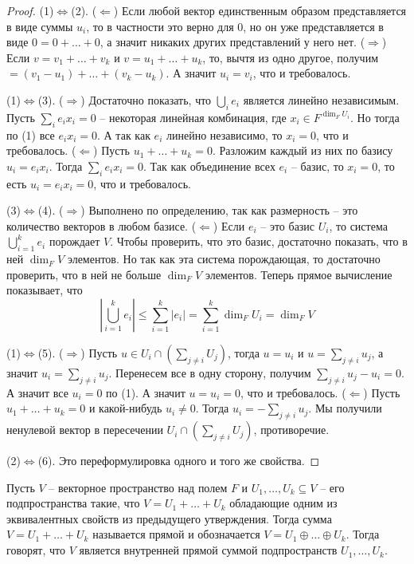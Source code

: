 \begin{proof}
(1)$\Leftrightarrow$(2).
($\Leftarrow$) Если любой вектор единственным образом представляется в виде суммы $u_i$, то в частности это верно для $0$, но он уже представляется в виде $0 = 0 + \ldots + 0$, а значит никаких других представлений у него нет.
($\Rightarrow$) Если $v = v_1 + \ldots + v_k$ и $v = u_1 + \ldots + u_k$, то, вычтя из одно другое, получим $ = (v_1 - u_1) + \ldots + (v_k - u_k)$.
А значит $u_i = v_i$, что и требовалось.

(1)$\Leftrightarrow$(3).
($\Rightarrow$) Достаточно показать, что $\bigcup_i e_i$ является линейно независимым.
Пусть $\sum_i e_i x_i = 0$ -- некоторая линейная комбинация, где $x_i\in F^{\dim_F U_i}$.
Но тогда по (1) все $e_i x_i = 0$.
А так как $e_i$ линейно независимо, то $x_i = 0$, что и требовалось.
($\Leftarrow$) Пусть $u_1 + \ldots + u_k = 0$.
Разложим каждый из них по базису $u_i = e_i x_i$.
Тогда $\sum_i e_i x_i = 0$.
Так как объединение всех $e_i$ -- базис, то $x_i = 0$, то есть $u_i = e_i x_i = 0$, что и требовалось.

(3)$\Leftrightarrow$(4).
($\Rightarrow$) Выполнено по определению, так как размерность -- это количество векторов в любом базисе.
($\Leftarrow$) Если $e_i$ -- это базис $U_i$, то система $\bigcup_{i=1}^k e_i$ порождает $V$.
Чтобы проверить, что это базис, достаточно показать, что в ней $\dim_F V$ элементов.
Но так как эта система порождающая, то достаточно проверить, что в ней не больше $\dim_F V$ элементов.
Теперь прямое вычисление показывает, что
\[
|\bigcup_{i=1}^k e_i|\leqslant \sum_{i=1}^k |e_i| = \sum_{i=1}^k \dim_F U_i = \dim_F V
\]


(1)$\Leftrightarrow$(5).
($\Rightarrow$) Пусть $u\in U_i\cap (\sum_{j\neq i} U_j)$, тогда $u = u_i$ и $u = \sum_{j\neq i} u_j$, а значит $u_i = \sum_{j\neq i} u _j$.
Перенесем все в одну сторону, получим $\sum_{j\neq i} u _j - u_i = 0$.
А значит все $u_i = 0$ по (1).
А значит $u = u_i = 0$, что и требовалось.
($\Leftarrow$) Пусть $u_1 + \ldots + u_k = 0$ и какой-нибудь $u_i\neq 0$.
Тогда $u_i = - \sum_{j\neq i}u_j$.
Мы получили ненулевой вектор в пересечении $U_i \cap (\sum_{j\neq i}U_j)$, противоречие.

(2)$\Leftrightarrow$(6).
Это переформулировка одного и того же свойства.

\end{proof}

\begin{definition}
Пусть $V$ -- векторное пространство над полем $F$ и $U_1,\ldots,U_k \subseteq V$ -- его подпространства такие, что $V = U_1+\ldots + U_k$ обладающие одним из эквивалентных свойств из предыдущего утверждения.
Тогда сумма $V = U_1+\ldots + U_k$  называется прямой и обозначается $V = U_1\oplus\ldots\oplus U_k$.
Тогда говорят, что $V$ является внутренней прямой суммой подпространств $U_1,\ldots,U_k$.
\end{definition}

